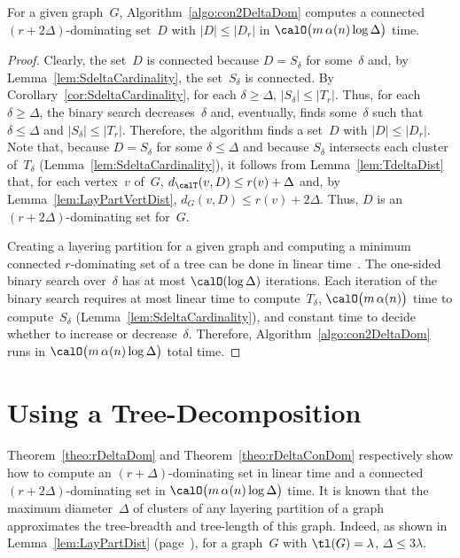 \begin{theorem}
    \label{theo:rDeltaConDom}
For a given graph~\( G \), Algorithm~\ref{algo:con2DeltaDom} computes a connected \( (r + 2 \Delta) \)-dominating set~\( D \) with \( |D| \leq |D_r| \) in \( \calO \big( m \, \alpha(n) \log \Delta \big) \) time.
\end{theorem}

\begin{proof}
Clearly, the set~$D$ is connected because $D = S_\delta$ for some~$\delta$ and, by Lemma~\ref{lem:SdeltaCardinality}, the set~$S_\delta$ is connected.
By Corollary~\ref{cor:SdeltaCardinality}, for each $\delta \geq \Delta$, $|S_\delta| \leq |T_r|$.
Thus, for each $\delta \geq \Delta$, the binary search decreases~$\delta$ and, eventually, finds some~$\delta$ such that $\delta \leq \Delta$ and $|S_\delta| \leq |T_r|$.
Therefore, the algorithm finds a set~$D$ with $|D| \leq |D_r|$.
Note that, because $D = S_\delta$ for some $\delta \leq \Delta$ and because $S_\delta$ intersects each cluster of~$T_\delta$ (Lemma~\ref{lem:SdeltaCardinality}), it follows from Lemma~\ref{lem:TdeltaDist} that, for each vertex~$v$ of~$G$, $d_\calT(v, D) \leq r(v) + \Delta$ and, by Lemma~\ref{lem:LayPartVertDist}, $d_G(v, D) \leq r(v) + 2 \Delta$.
Thus, $D$ is an $(r + 2 \Delta)$-dominating set for~$G$.

Creating a layering partition for a given graph and computing a minimum connected $r$-dominating set of a tree can be done in linear time~\cite{Dragan1993}.
The one-sided binary search over~$\delta$ has at most $\calO(\log \Delta)$ iterations.
Each iteration of the binary search requires at most linear time to compute~$T_\delta$, $\calO \big( m \, \alpha(n) \big)$ time to compute~$S_\delta$ (Lemma~\ref{lem:SdeltaCardinality}), and constant time to decide whether to increase or decrease~$\delta$.
Therefore, Algorithm~\ref{algo:con2DeltaDom} runs in $\calO \big( m \, \alpha(n) \log \Delta \big)$ total time.
\end{proof}


\section{Using a Tree-Decomposition}

Theorem~\ref{theo:rDeltaDom} and Theorem~\ref{theo:rDeltaConDom} respectively show how to compute an $(r + \Delta)$-dominating set in linear time and a connected $(r + 2 \Delta)$-dominating set in $\calO \big( m \, \alpha(n) \log \Delta \big)$ time.
It is known that the maximum diameter~$\Delta$ of clusters of any layering partition of a graph approximates the tree-breadth and tree-length of this graph.
Indeed, as shown in Lemma~\ref{lem:LayPartDist} (page~\pageref{lem:LayPartDist}), for a graph~$G$ with $\tl(G) = \lambda$, $\Delta \leq 3 \lambda$.

